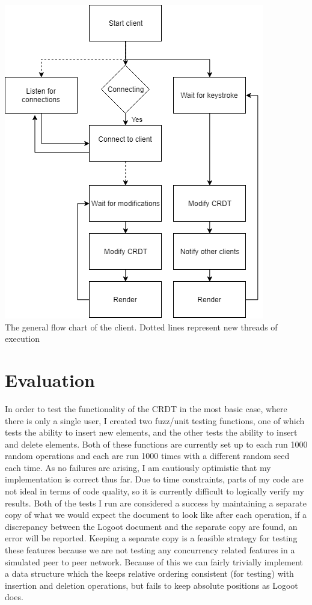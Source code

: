 \documentclass[11pt]{article}
\begin{document}
\begin{center}
	\includegraphics[scale=0.75]{client.png}\\
	The general flow chart of the client. Dotted lines represent new threads of execution
\end{center}

\pagebreak

\section{Evaluation}
In order to test the functionality of the CRDT in the most basic case, where there is only a single user, I created two fuzz/unit testing functions, one of which tests the ability to insert new elements, and the other tests the ability to insert and delete elements. Both of these functions are currently set up to each run 1000 random operations and each are run 1000 times with a different random seed each time. As no failures are arising, I am cautiously optimistic that my implementation is correct thus far. Due to time constraints, parts of my code are not ideal in terms of code quality, so it is currently difficult to logically verify my results. Both of the tests I run are considered a success by maintaining a separate copy of what we would expect the document to look like after each operation, if a discrepancy between the Logoot document and the separate copy are found, an error will be reported. Keeping a separate copy is a feasible strategy for testing these features because we are not testing any concurrency related features in a simulated peer to peer network. Because of this we can fairly trivially implement a data structure which the keeps relative ordering consistent (for testing) with insertion and deletion operations, but fails to keep absolute positions as Logoot does.\\
\end{document}
